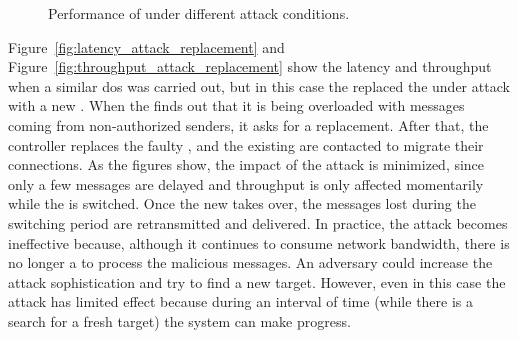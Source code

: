 \begin{figure}[h]
\hspace{-5mm}
\hspace{-5mm}
\caption{\small Performance of \sieveq under different attack conditions.}
\label{fig:performance_attacks}
\end{figure}

Figure~\ref{fig:latency_attack_replacement} and Figure~\ref{fig:throughput_attack_replacement} show the latency and throughput when a similar \gls{dos} was carried out, but in this case the \sieveq replaced the \presieve under attack with a new \presieve.
When the \presieve finds out that it is being overloaded with messages coming from non-authorized senders, it asks for a replacement.
After that, the controller replaces the faulty \presieve, and the existing \senders are contacted to migrate their connections.
As the figures show, the impact of the attack is minimized, since only a few messages are delayed and throughput is only affected momentarily while the \presieve is switched.
Once the new \presieve takes over, the messages lost during the switching period are retransmitted and delivered.
In practice, the attack becomes ineffective because, although it continues to consume network bandwidth, there is no longer a \presieve to process the malicious messages.
An adversary could increase the attack sophistication and try to find a new \presieve target.
However, even in this case the attack has limited effect because during an interval of time (while there is a search for a fresh target) the system can make progress.

